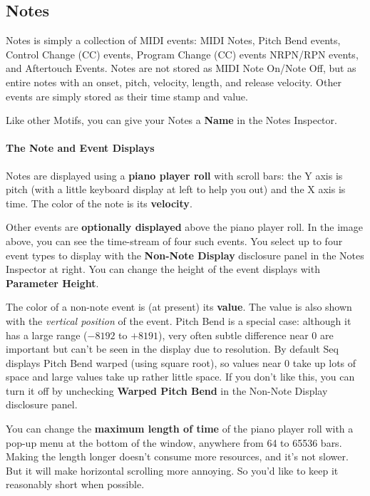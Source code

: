 \documentclass[twoside,10pt]{article}
\begin{document}
\subsection{Notes}
 
Notes is simply a collection of MIDI events: MIDI Notes, Pitch Bend events, Control Change (CC) events, Program Change (CC) events NRPN/RPN events, and Aftertouch Events.  Notes are not stored as MIDI Note On/Note Off, but as entire notes with an onset, pitch, velocity, length, and release velocity.   Other events are simply stored as their time stamp and value.  

Like other Motifs, you can give your Notes a {\bf Name} in the Notes Inspector.  

\paragraph{The Note and Event Displays}

Notes are displayed using a {\bf piano player roll} with scroll bars: the Y axis is pitch (with a little keyboard display at left to help you out) and the X axis is time.  The color of the note is its {\bf velocity}.  

Other events are {\bf optionally displayed} above the piano player roll.  In the image above, you can see the time-stream of four such events. You select up to four event types to display with the {\bf Non-Note Display} disclosure panel in the Notes Inspector at right.  You can change the height of the event displays with {\bf Parameter Height}.

The color of a non-note event is (at present) its {\bf value}.   The value is also shown with the {\it vertical position} of the event.  Pitch Bend is a special case: although it has a large range (\(-8192\) to \(+8191\)), very often subtle difference near 0 are important but can't be seen in the display due to resolution.  By default Seq displays Pitch Bend warped (using square root), so values near 0 take up lots of space and large values take up rather little space.  If you don't like this, you can turn it off by unchecking {\bf Warped Pitch Bend} in the Non-Note Display disclosure panel.

 You can change the {\bf maximum length of time} of the piano player roll with a pop-up menu at the bottom of the window, anywhere from 64 to 65536 bars.  Making the length longer doesn't consume more resources, and it's not slower.  But it will make horizontal scrolling more annoying.  So you'd like to keep it reasonably short when possible.
\end{document}
